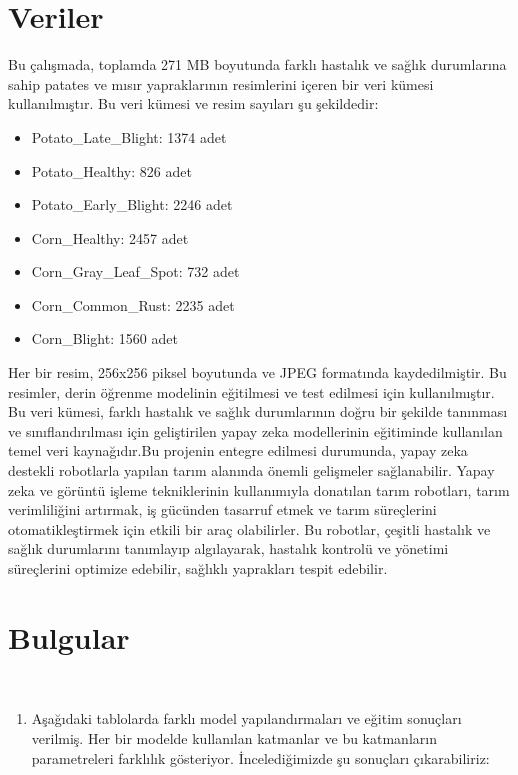 \documentclass[12pt,a4paper]{article}
\begin{document}
\begin{enumerate}
\begin{enumerate}
				\pagebreak
				
					\section{Veriler}
				
				
				
				
		\hspace{3em} 	Bu çalışmada, toplamda 271 MB boyutunda farklı hastalık ve sağlık durumlarına sahip patates ve mısır yapraklarının resimlerini içeren bir veri kümesi kullanılmıştır. Bu veri kümesi ve resim sayıları şu şekildedir:
				
				\begin{itemize}
					\item Potato\_Late\_Blight: 1374 adet
					\item Potato\_Healthy: 826 adet
					\item Potato\_Early\_Blight: 2246 adet
					\item Corn\_Healthy: 2457 adet
					\item Corn\_Gray\_Leaf\_Spot: 732 adet
					\item Corn\_Common\_Rust: 2235 adet
					\item Corn\_Blight: 1560 adet
				\end{itemize}
				
				
				Her bir resim, 256x256 piksel boyutunda ve JPEG formatında kaydedilmiştir. Bu resimler, derin öğrenme modelinin eğitilmesi ve test edilmesi için kullanılmıştır. Bu veri kümesi, farklı hastalık ve sağlık durumlarının doğru bir şekilde tanınması ve sınıflandırılması için geliştirilen yapay zeka modellerinin eğitiminde kullanılan temel veri kaynağıdır.Bu projenin entegre edilmesi durumunda, yapay zeka destekli robotlarla yapılan tarım alanında önemli gelişmeler sağlanabilir. Yapay zeka ve görüntü işleme tekniklerinin kullanımıyla donatılan tarım robotları, tarım verimliliğini artırmak, iş gücünden tasarruf etmek ve tarım süreçlerini otomatikleştirmek için etkili bir araç olabilirler. Bu robotlar, çeşitli hastalık ve sağlık durumlarını tanımlayıp algılayarak, hastalık kontrolü ve yönetimi süreçlerini optimize edebilir, sağlıklı yaprakları tespit edebilir.
				
				 
				
				
				\clearpage
				

	\section{Bulgular}			
\
\begin{enumerate}
	\item Aşağıdaki tablolarda farklı model yapılandırmaları ve eğitim sonuçları verilmiş. Her bir modelde kullanılan katmanlar ve bu katmanların parametreleri farklılık gösteriyor. İncelediğimizde şu sonuçları çıkarabiliriz:
	

\end{enumerate}
\end{enumerate}
\end{enumerate}
\end{document}
